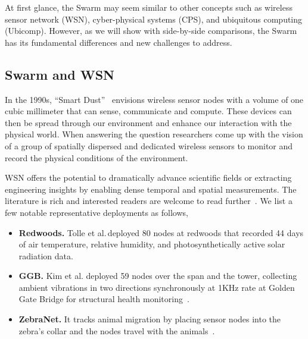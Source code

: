 

At first glance, the Swarm may seem similar to other concepts such as wireless
sensor network (WSN), cyber-physical systems (CPS), and ubiquitous computing
(Ubicomp). However, as we will show with side-by-side comparisons, the Swarm has
its fundamental differences and new challenges to address.

\subsection{Swarm and WSN}
\label{sec:swarm-wsn}

In the 1990s, ``Smart Dust''~\cite{kahn1999next} envisions wireless sensor nodes
with a volume of one cubic millimeter that can sense, communicate and
compute. These devices can then be spread through our environment and enhance
our interaction with the physical world. When answering the question
researchers come up with the vision of a group of spatially dispersed and
dedicated wireless sensors to monitor and record the physical conditions of the
environment.

WSN offers the potential to dramatically advance scientific fields or extracting
engineering insights by enabling dense temporal and spatial measurements. The
literature is rich and interested readers are welcome to read
further~\cite{akyildiz2002wireless, zhao2009wireless}. We list a few notable
representative deployments as follows,

\begin{itemize}[itemsep=5pt]
\item \textbf{Redwoods.} Tolle et al.\,deployed 80 nodes at redwoods that
  recorded 44 days of air temperature, relative humidity, and photosynthetically
  active solar radiation data.~\cite{tolle2005macroscope}
\item \textbf{GGB.} Kim et al. deployed 59 nodes over the span and the tower,
  collecting ambient vibrations in two directions synchronously at 1KHz rate at
  Golden Gate Bridge for structural health monitoring~\cite{kim2007health}.
\item \textbf{ZebraNet.} It tracks animal migration by placing sensor nodes into
  the zebra's collar and the nodes travel with the
  animals~\cite{zhang2005habitat}.
\end{itemize}


